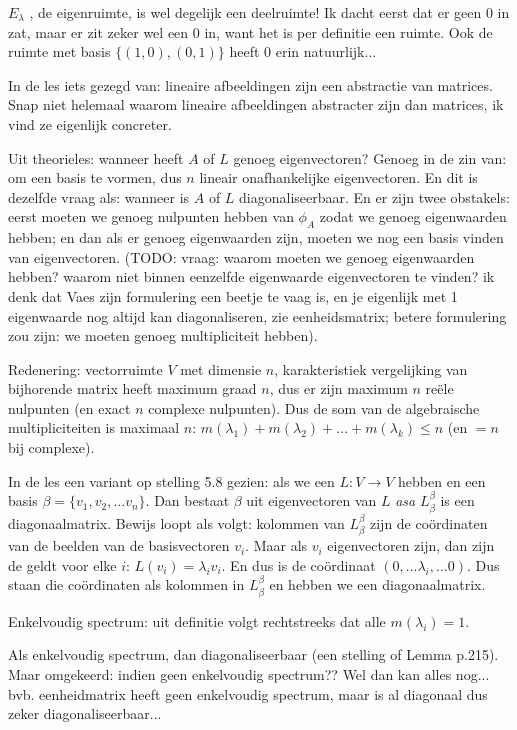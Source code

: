 \documentclass{article}
\begin{document}
$E_{\lambda}$ , de eigenruimte, is wel degelijk een deelruimte! Ik dacht eerst dat er geen $0$ in zat, maar er zit zeker wel een $0$ in, want het is per definitie een ruimte. Ook de ruimte met basis $\{ (1,0), (0,1) \}$ heeft $0$ erin natuurlijk... 


In de les iets gezegd van: lineaire afbeeldingen zijn een abstractie van matrices. Snap niet helemaal waarom lineaire afbeeldingen abstracter zijn dan matrices, ik vind ze eigenlijk concreter. 

Uit theorieles: wanneer heeft $A$ of $L$ genoeg eigenvectoren? Genoeg in de zin van: om een basis te vormen, dus $n$ lineair onafhankelijke eigenvectoren. En dit is dezelfde vraag als: wanneer is $A$ of $L$ diagonaliseerbaar. En er zijn twee obstakels: eerst moeten we genoeg nulpunten hebben van $\phi_A$ zodat we genoeg eigenwaarden hebben; en dan als er genoeg eigenwaarden zijn, moeten we nog een basis vinden van eigenvectoren. 
(TODO: vraag: waarom moeten we genoeg eigenwaarden hebben? waarom niet binnen eenzelfde eigenwaarde eigenvectoren te vinden? ik denk dat Vaes zijn formulering een beetje te vaag is, en je eigenlijk met 1 eigenwaarde nog altijd kan diagonaliseren, zie eenheidsmatrix; betere formulering zou zijn: we moeten genoeg multipliciteit hebben). 

Redenering: vectorruimte $V$ met dimensie $n$, karakteristiek vergelijking van bijhorende matrix heeft maximum graad $n$, dus er zijn maximum $n$ re\"ele nulpunten (en exact $n$ complexe nulpunten). Dus de som van de algebraische multipliciteiten is maximaal $n$: $m(\lambda_1) + m(\lambda_2) + ... + m(\lambda_k) \leq n $ (en $=n$ bij complexe). 

In de les een variant op stelling 5.8 gezien: als we een $L: V \to V$ hebben en een basis $\beta=\{ v_1, v_2, ... v_n \}$. Dan bestaat $\beta$ uit eigenvectoren van $L$ \emph{asa} $L_\beta^\beta$ is een diagonaalmatrix. Bewijs loopt als volgt: kolommen van $L_\beta^\beta$ zijn de co\"ordinaten van de beelden van de basisvectoren $v_i$. Maar als $v_i$ eigenvectoren zijn, dan zijn de geldt voor elke $i$: $L(v_i) = \lambda_i v_i$. En dus is de co\"ordinaat $(0, ... \lambda_i, ... 0)$. Dus staan die co\"ordinaten als kolommen in $L_\beta^\beta$ en hebben we een diagonaalmatrix. 

Enkelvoudig spectrum: uit definitie volgt rechtstreeks dat alle $m(\lambda_i)=1$. 

Als enkelvoudig spectrum, dan diagonaliseerbaar (een stelling of Lemma p.215). Maar omgekeerd: indien geen enkelvoudig spectrum?? Wel dan kan alles nog... bvb. eenheidmatrix heeft geen enkelvoudig spectrum, maar is al diagonaal dus zeker diagonaliseerbaar... 
\end{document}
